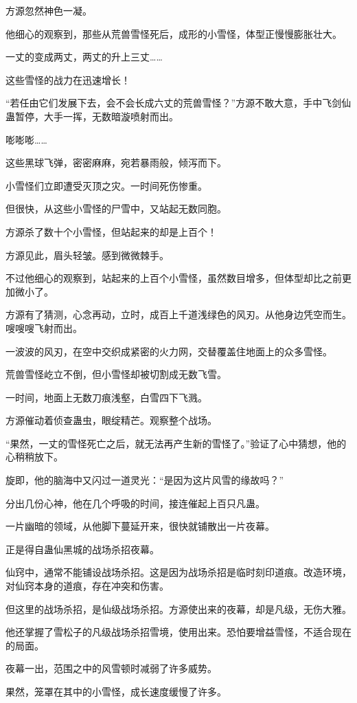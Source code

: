 \begin{this_body}
方源忽然神色一凝。

他细心的观察到，那些从荒兽雪怪死后，成形的小雪怪，体型正慢慢膨胀壮大。

一丈的变成两丈，两丈的升上三丈……

这些雪怪的战力在迅速增长！

“若任由它们发展下去，会不会长成六丈的荒兽雪怪？”方源不敢大意，手中飞剑仙蛊暂停，大手一挥，无数暗漩喷射而出。

嘭嘭嘭……

这些黑球飞弹，密密麻麻，宛若暴雨般，倾泻而下。

小雪怪们立即遭受灭顶之灾。一时间死伤惨重。

但很快，从这些小雪怪的尸雪中，又站起无数同胞。

方源杀了数十个小雪怪，但站起来的却是上百个！

方源见此，眉头轻皱。感到微微棘手。

不过他细心的观察到，站起来的上百个小雪怪，虽然数目增多，但体型却比之前更加微小了。

方源有了猜测，心念再动，立时，成百上千道浅绿色的风刃。从他身边凭空而生。嗖嗖嗖飞射而出。

一波波的风刃，在空中交织成紧密的火力网，交替覆盖住地面上的众多雪怪。

荒兽雪怪屹立不倒，但小雪怪却被切割成无数飞雪。

一时间，地面上无数刀痕浅壑，白雪四下飞溅。

方源催动着侦查蛊虫，眼绽精芒。观察整个战场。

“果然，一丈的雪怪死亡之后，就无法再产生新的雪怪了。”验证了心中猜想，他的心稍稍放下。

旋即，他的脑海中又闪过一道灵光：“是因为这片风雪的缘故吗？”

分出几份心神，他在几个呼吸的时间，接连催起上百只凡蛊。

一片幽暗的领域，从他脚下蔓延开来，很快就铺散出一片夜幕。

正是得自蛊仙黑城的战场杀招夜幕。

仙窍中，通常不能铺设战场杀招。这是因为战场杀招是临时刻印道痕。改造环境，对仙窍本身的道痕，存在冲突和伤害。

但这里的战场杀招，是仙级战场杀招。方源使出来的夜幕，却是凡级，无伤大雅。

他还掌握了雪松子的凡级战场杀招雪境，使用出来。恐怕要增益雪怪，不适合现在的局面。

夜幕一出，范围之中的风雪顿时减弱了许多威势。

果然，笼罩在其中的小雪怪，成长速度缓慢了许多。


\end{this_body}
